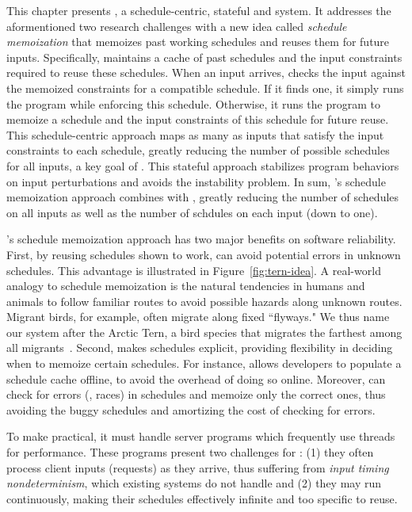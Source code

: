 This chapter presents \tern, a schedule-centric, stateful \smt and \dmt system. 
It addresses the aformentioned two research challenges with a new idea called
\emph{schedule memoization} that memoizes past working schedules and reuses them
for future inputs.  Specifically, \tern maintains a cache of past schedules and
the input constraints required to reuse these schedules.  When an input arrives,
\tern checks the input against the memoized constraints for a compatible
schedule.  If it finds one, it simply runs the program while enforcing
this schedule.  Otherwise, it runs the program to memoize a schedule and
the input constraints of this schedule for future reuse. This schedule-centric
approach maps as many as inputs that satisfy the input constraints to each
schedule, greatly reducing the number of possible schedules for all inputs, a
key goal of \smt. This stateful approach stabilizes program behaviors
on input perturbations and avoids the instability problem. In sum, \tern's
schedule memoization approach combines \dmt with \smt, greatly reducing the
number of schedules on all inputs as well as the number of schdules on each
input (down to one).

\tern's schedule memoization approach has two major benefits on software
reliability. First, by reusing schedules shown to work, \tern can avoid
potential errors in unknown schedules.  This advantage is illustrated in
Figure~\ref{fig:tern-idea}. A real-world analogy to schedule memoization is the
natural tendencies in humans and animals to follow familiar routes to avoid
possible hazards along unknown routes.  Migrant birds, for example, often
migrate along fixed ``flyways."  We thus name our system after the Arctic Tern,
a bird species that migrates the farthest among all
migrants~\cite{artic-tern-wiki}. Second, \tern makes schedules explicit,
providing flexibility in deciding when to memoize certain schedules.  For
instance, \tern allows developers to populate a schedule cache offline, to avoid
the overhead of doing so online.  Moreover, \tern can check for errors (\eg,
races) in schedules and memoize only the correct ones, thus avoiding the buggy
schedules and amortizing the cost of checking for errors.

To make \tern practical, it must handle server programs which frequently
use threads for performance.  These programs present two challenges for
\tern: (1) they often process client inputs (requests) as they arrive, thus
suffering from \emph{input timing nondeterminism}, which existing \dmt systems
do not handle and (2) they may run continuously, making their schedules
effectively infinite and too specific to reuse.

